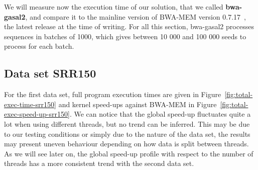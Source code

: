 We will measure now the execution time of our solution, that we called \textbf{bwa-gasal2}, and compare it to the mainline version of BWA-MEM version 0.7.17~\cite{lh3:bwa}, the latest release at the time of writing. For all this section, bwa-gasal2 processes sequences in batches of 1000, which gives between 10 000 and 100 000 seeds to process for each batch.

\subsection{Data set SRR150}

For the first data set, full program execution times are given in Figure~\ref{fig:total-exec-time-srr150} and kernel speed-ups against BWA-MEM in Figure~\ref{fig:total-exec-speed-up-srr150}. We can notice that the global speed-up fluctuates quite a lot when using different threads, but no trend can be inferred. This may be due to our testing conditions or simply due to the nature of the data set, the results may present uneven behaviour depending on how data is split between threads. As we will see later on, the global speed-up profile with respect to the number of threads has a more consistent trend with the second data set.

